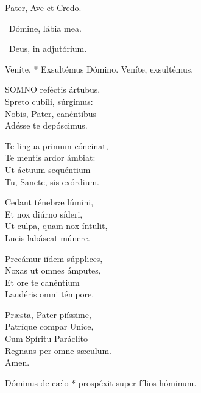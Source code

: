 Pater, Ave et Credo.

\V\ Dómine, lábia mea.

\V\ Deus, in adjutórium.



 Veníte, * Exsultémus Dómino.  Veníte, exsultémus.



\lettrine[lines=2]{S}{OMNO} reféctis ártubus,\\
Spreto cubíli, súrgimus:\\
Nobis, Pater, canéntibus\\
Adésse te depóscimus.

Te lingua primum cóncinat,\\
Te mentis ardor ámbiat:\\
Ut áctuum sequéntium\\
Tu, Sancte, sis exórdium.

Cedant ténebræ lúmini,\\
Et nox diúrno síderi,\\
Ut culpa, quam nox íntulit,\\
Lucis labáscat múnere.

Precámur iídem súpplices,\\
Noxas ut omnes ámputes,\\
Et ore te canéntium\\
Laudéris omni témpore.

Præsta, Pater piíssime,\\
Patríque compar Unice,\\
Cum Spíritu Paráclito\\
Regnans per omne sæculum.\\
Amen.


 Dóminus de cælo * prospéxit super fílios hóminum.


